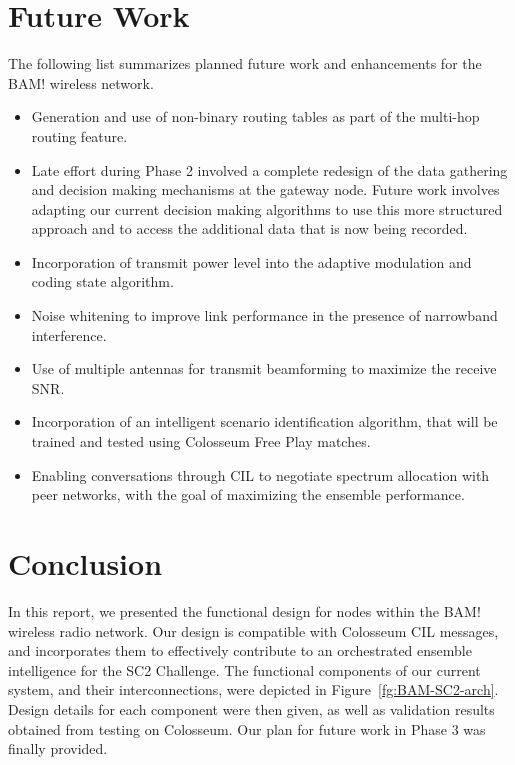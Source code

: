 \documentclass[11pt]{article}
\begin{document}
 \section{Future Work}
 The following list summarizes planned future work and enhancements for the BAM! wireless network.
 \begin{itemize}
     \item Generation and use of non-binary routing tables as part of the multi-hop routing feature.
     \item Late effort during Phase 2 involved a complete redesign of the data gathering and decision making mechanisms at the gateway node. Future work involves adapting our current decision making algorithms to use this more structured approach and to access the additional data that is now being recorded. 
     \item Incorporation of transmit power level into the adaptive modulation and coding state algorithm.
     \item Noise whitening to improve link performance in the presence of narrowband interference.
     \item Use of multiple antennas for transmit beamforming to maximize the receive SNR.
     \item Incorporation of an intelligent scenario identification algorithm, that will be trained and tested using Colosseum Free Play matches.
     \item Enabling conversations through CIL to negotiate spectrum allocation with peer networks, with the goal of maximizing the ensemble performance.
     
 \end{itemize}
 
 \section{Conclusion}
 In this report, we presented the functional design for nodes within the BAM! wireless radio network. Our design is compatible with Colosseum CIL messages, and incorporates them to effectively contribute to an orchestrated ensemble intelligence for the SC2 Challenge. The functional components of our current system, and their interconnections, were depicted in Figure~\ref{fg:BAM-SC2-arch}. Design details for each component were then given, as well as validation results obtained from testing on Colosseum. Our plan for future work in Phase 3 was finally provided. 
\end{document}
